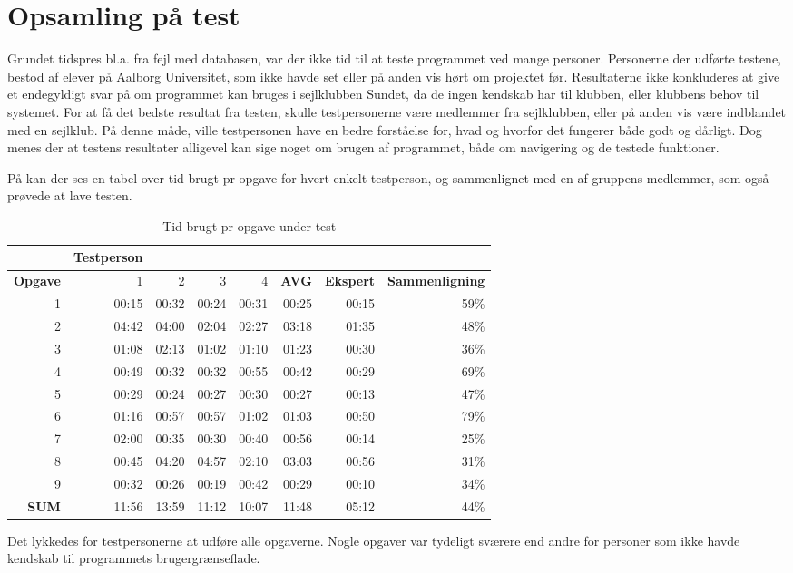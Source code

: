 \section{Opsamling på test}

Grundet tidspres bl.a. fra fejl med databasen, var der ikke tid til at teste programmet ved mange personer.
Personerne der udførte testene, bestod af elever på Aalborg Universitet, som ikke havde set eller på anden vis hørt om projektet før.
Resultaterne ikke konkluderes at give et endegyldigt svar på om programmet kan bruges i sejlklubben Sundet, da de ingen kendskab har til klubben, eller klubbens behov til systemet.
For at få det bedste resultat fra testen, skulle testpersonerne være medlemmer fra sejlklubben, eller på anden vis være indblandet med en sejlklub. 
På denne måde, ville testpersonen have en bedre forståelse for, hvad og hvorfor det fungerer både godt og dårligt.
Dog menes der at testens resultater alligevel kan sige noget om brugen af programmet, både om navigering og de testede funktioner.

På  kan der ses en tabel over tid brugt pr opgave for hvert enkelt testperson, og sammenlignet med en af gruppens medlemmer, som også prøvede at lave testen.

\begin{table}[htbp]
  \centering
  \caption{Tid brugt pr opgave under test}
    \begin{tabular}{r|rrrr|r|r|r}
    \toprule
          & \textbf{Testperson} &       &       &       &       &       &  \\
    \midrule
    \textbf{Opgave} & 1     & 2     & 3     & 4     & \textbf{AVG} & \textbf{Ekspert} & \textbf{Sammenligning} \\
    1     & 00:15 & 00:32 & 00:24 & 00:31 & 00:25 & 00:15 & 59\% \\
    2     & 04:42 & 04:00 & 02:04 & 02:27 & 03:18 & 01:35 & 48\% \\
    3     & 01:08 & 02:13 & 01:02 & 01:10 & 01:23 & 00:30 & 36\% \\
    4     & 00:49 & 00:32 & 00:32 & 00:55 & 00:42 & 00:29 & 69\% \\
    5     & 00:29 & 00:24 & 00:27 & 00:30 & 00:27 & 00:13 & 47\% \\
    6     & 01:16 & 00:57 & 00:57 & 01:02 & 01:03 & 00:50 & 79\% \\
    7     & 02:00 & 00:35 & 00:30 & 00:40 & 00:56 & 00:14 & 25\% \\
    8     & 00:45 & 04:20 & 04:57 & 02:10 & 03:03 & 00:56 & 31\% \\
    9     & 00:32 & 00:26 & 00:19 & 00:42 & 00:29 & 00:10 & 34\% \\
    \textbf{SUM} & 11:56 & 13:59 & 11:12 & 10:07 & 11:48 & 05:12 & 44\% \\
    \bottomrule
    \end{tabular}%
  \label{tab:TestTimeTable}%
\end{table}%

Det lykkedes for testpersonerne at udføre alle opgaverne.
Nogle opgaver var tydeligt sværere end andre for personer som ikke havde kendskab til programmets brugergrænseflade. 
